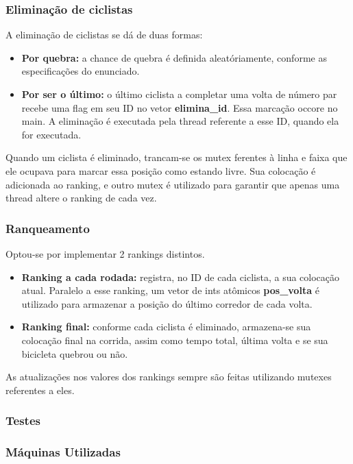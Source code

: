 \documentclass{beamer}
\begin{document}
\begin{frame}
\frametitle{Eliminação de ciclistas}
A eliminação de ciclistas se dá de duas formas:

\begin{itemize}
\item \textbf{Por quebra:} a chance de quebra é definida aleatóriamente, conforme as especificações do enunciado.
\item \textbf{Por ser o último:} o último ciclista a completar uma volta de número par recebe uma flag em seu ID no vetor \textbf{elimina\_id}. Essa marcação occore no main. A eliminação é executada pela thread referente a esse ID, quando ela for executada. 
\end{itemize}

Quando um ciclista é eliminado, trancam-se os mutex ferentes à linha e faixa que ele ocupava para marcar essa posição como estando livre. Sua colocação é adicionada ao ranking, e outro mutex é utilizado para garantir que apenas uma thread altere o ranking de cada vez.
\end{frame}




\begin{frame}
\frametitle{Ranqueamento}
Optou-se por implementar 2 rankings distintos.

\begin{itemize}
\item \textbf{Ranking a cada rodada:} registra, no ID de cada ciclista, a sua colocação atual. Paralelo a esse ranking, um vetor de ints atômicos \textbf{pos_volta} é utilizado para armazenar a posição do último corredor de cada volta.

\item \textbf{Ranking final:} conforme cada ciclista é eliminado, armazena-se sua colocação final na corrida, assim como tempo total, última volta e se sua bicicleta quebrou ou não.   
\end{itemize}

As atualizações nos valores dos rankings sempre são feitas utilizando mutexes referentes a eles.
\end{frame}




\begin{frame}
\frametitle{Testes}



\end{frame}

\begin{frame}
\frametitle{Máquinas Utilizadas}



\end{frame}
\end{document}
